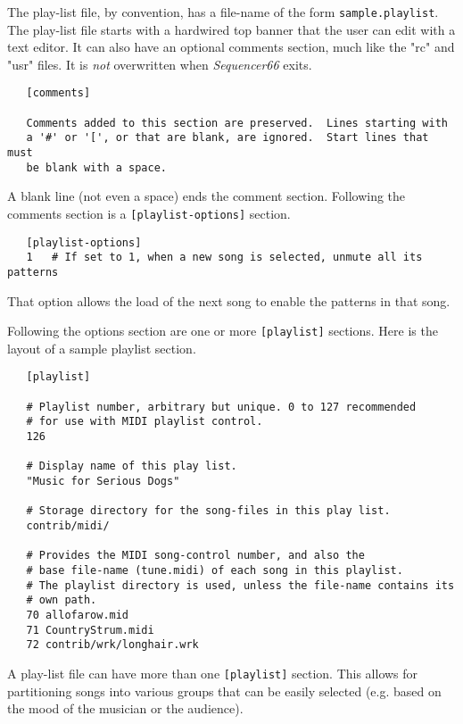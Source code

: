    The play-list file, by convention, has a file-name of the form
   \texttt{sample.playlist}.
   The play-list file starts with a hardwired top banner that the user can edit
   with a text editor.  It can also have an optional comments section, much
   like the "rc" and "usr" files.  It is \textsl{not} overwritten
   when \textsl{Sequencer66} exits.

   \begin{verbatim}
   [comments]

   Comments added to this section are preserved.  Lines starting with
   a '#' or '[', or that are blank, are ignored.  Start lines that must
   be blank with a space.
   \end{verbatim}

   A blank line (not even a space) ends the comment section.
   Following the comments section is a \texttt{[playlist-options]} section.

   \begin{verbatim}
   [playlist-options]
   1   # If set to 1, when a new song is selected, unmute all its patterns
   \end{verbatim}

   That option allows the load of the next song to enable the patterns in that
   song.

   Following the options section are one or more \texttt{[playlist]} sections.
   Here is the layout of a sample playlist section.

   \begin{verbatim}
   [playlist]

   # Playlist number, arbitrary but unique. 0 to 127 recommended
   # for use with MIDI playlist control.
   126

   # Display name of this play list.
   "Music for Serious Dogs"

   # Storage directory for the song-files in this play list.
   contrib/midi/

   # Provides the MIDI song-control number, and also the
   # base file-name (tune.midi) of each song in this playlist.
   # The playlist directory is used, unless the file-name contains its
   # own path.
   70 allofarow.mid
   71 CountryStrum.midi
   72 contrib/wrk/longhair.wrk
   \end{verbatim}

   A play-list file can have more than one \texttt{[playlist]} section.  This
   allows for partitioning songs into various groups that can be easily
   selected (e.g. based on the mood of the musician or the audience).

